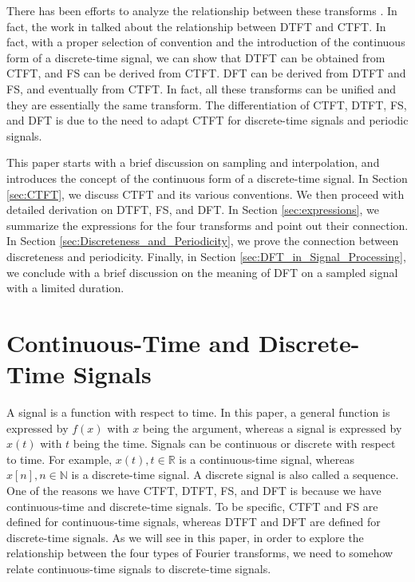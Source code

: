 \documentclass[journal,twoside]{IEEEtran}
\begin{document}
There has been efforts to analyze the relationship between these transforms \cite{ref:Bracewell, ref:Lindegren, ref:Tjoa, ref:Fernsanz}. In fact, the work in \cite{ref:Fernsanz} talked about the relationship between DTFT and CTFT. In fact, with a proper selection of convention and the introduction of the continuous form of a discrete-time signal, we can show that DTFT can be obtained from CTFT, and FS can be derived from CTFT. DFT can be derived from DTFT and FS, and eventually from CTFT. In fact, all these transforms can be unified and they are essentially the same transform. The differentiation of CTFT, DTFT, FS, and DFT is due to the need to adapt CTFT for discrete-time signals and periodic signals.

This paper starts with a brief discussion on sampling and interpolation, and introduces the concept of the continuous form of a discrete-time signal. In Section \ref{sec:CTFT}, we discuss CTFT and its various conventions. We then proceed with detailed derivation on DTFT, FS, and DFT. In Section \ref{sec:expressions}, we summarize the expressions for the four transforms and point out their connection. In Section \ref{sec:Discreteness_and_Periodicity}, we prove the connection between discreteness and periodicity. Finally, in Section \ref{sec:DFT_in_Signal_Processing}, we conclude with a brief discussion on the meaning of DFT on a sampled signal with a limited duration.

\section{Continuous-Time and Discrete-Time Signals}

A signal is a function with respect to time. In this paper, a general function is expressed by $f(x)$ with $x$ being the argument, whereas a signal is expressed by $x(t)$ with $t$ being the time. Signals can be continuous or discrete with respect to time. For example, $x(t), t\in\mathbb{R}$ is a continuous-time signal, whereas $x[n], n\in\mathbb{N}$ is a discrete-time signal. A discrete signal is also called a sequence. One of the reasons we have CTFT, DTFT, FS, and DFT is because we have continuous-time and discrete-time signals. To be specific, CTFT and FS are defined for continuous-time signals, whereas DTFT and DFT are defined for discrete-time signals. As we will see in this paper, in order to explore the relationship between the four types of Fourier transforms, we need to somehow relate continuous-time signals to discrete-time signals.
\end{document}

